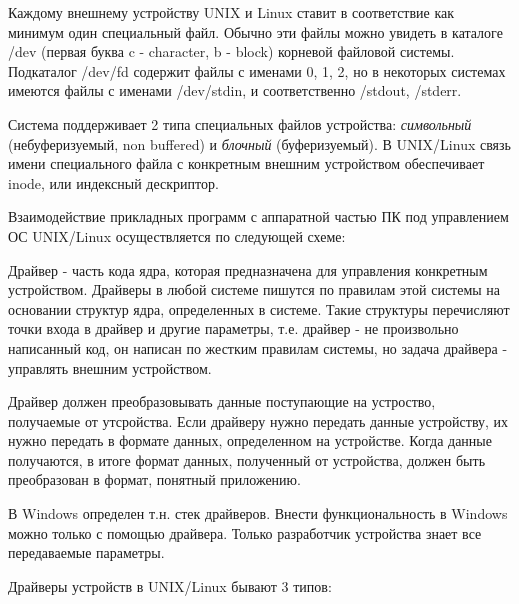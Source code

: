 \documentclass[12pt,a4paper]{scrreprt}
\begin{document}
Каждому внешнему устройству UNIX и Linux ставит в соответствие как минимум один специальный файл. Обычно эти файлы можно увидеть в каталоге /dev (первая буква c - character, b - block) корневой файловой системы. Подкаталог /dev/fd содержит файлы с именами 0, 1, 2, но в некоторых системах имеются файлы с именами /dev/stdin, и соответственно /stdout, /stderr.

Система поддерживает 2 типа специальных файлов устройства: \textit{символьный }(небуферизуемый, non buffered) и \textit{блочный} (буферизуемый). В UNIX/Linux связь имени специального файла с конкретным внешним устройством обеспечивает inode, или индексный дескриптор.

Взаимодействие прикладных программ с аппаратной частью ПК под управлением ОС UNIX/Linux осуществляется по следующей схеме:

\begin{figure}[!h]
\end{figure}

Драйвер - часть кода ядра, которая предназначена для управления конкретным устройством. Драйверы в любой системе пишутся по правилам этой системы на основании структур ядра, определенных в системе. Такие структуры перечисляют точки входа в драйвер и другие параметры, т.е. драйвер - не произвольно написанный код, он написан по жестким правилам системы, но задача драйвера - управлять внешним устройством.

Драйвер должен преобразовывать данные поступающие на устроство, получаемые от утсройства. Если драйверу нужно передать данные устройству, их нужно передать в формате данных, определенном на устройстве. Когда данные получаются, в итоге формат данных, полученный от устройства, должен быть преобразован в формат, понятный приложению.

В Windows определен т.н. стек драйверов. Внести функциональность в Windows можно только с помощью драйвера. Только разработчик устройства знает все передаваемые параметры.

Драйверы устройств в UNIX/Linux бывают 3 типов:
\end{document}
